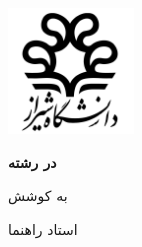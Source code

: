 \begin{titlepage}
    \centering
    \includegraphics[width=0.25\textwidth]{assets/shiraz_university_logo}

    \vspace{\baselineskip}
    \textbf{\PersianSchool}

    \textbf{{\PersianType} {\PersianDegree} در رشته \\ {\PersianField}}

    \vspace{3\baselineskip}
    \textbf{\large \PersianTitle}

    \vspace{3\baselineskip}
    به کوشش \\
    \textbf{\PersianName}

    \vspace{2\baselineskip}
    استاد راهنما \\
    \textbf{\PersianSupervisor}

    \vspace{\baselineskip}
    \textbf{\PersianDate}
\end{titlepage}

